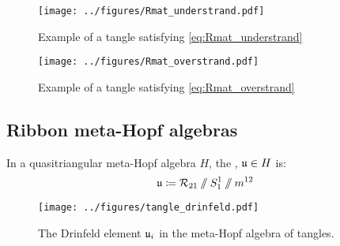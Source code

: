 \documentclass{beamer}
\theoremstyle{theorem}
\begin{document}
\begin{frame}
        \begin{figure}
                \centering
                \texttt{[image: ../figures/Rmat\_understrand.pdf]}
                \caption{Example of a tangle satisfying \cref{eq:Rmat_understrand}}
                \label{fig:Rmat_understrand}
        \end{figure}
\end{frame}

\begin{frame}
        \begin{figure}
                \centering
                \texttt{[image: ../figures/Rmat\_overstrand.pdf]}
                \caption{Example of a tangle satisfying \cref{eq:Rmat_overstrand}}
                \label{fig:Rmat_overstrand}
        \end{figure}
\end{frame}

\subsection{Ribbon meta-Hopf algebras}

\begin{frame}
        \begin{definition}
                In a quasitriangular meta-Hopf algebra $H$, the , $\mathfrak{u} \in H$ is:
                \begin{equation}
                        \mathfrak{u} \coloneq \mathcal{R}_{21}\mathbin{/\mkern-6mu/}S^1_1 \mathbin{/\mkern-6mu/} m^{12}
                \end{equation}
        \end{definition}
        \pause
        \begin{figure}
                \centering
                \texttt{[image: ../figures/tangle\_drinfeld.pdf]}
                \caption{The Drinfeld element $\mathfrak{u}_i$ in the meta-Hopf algebra of
                tangles.}
                \label{fig:tangle_drinfeld}
        \end{figure}
\end{frame}
\end{document}
